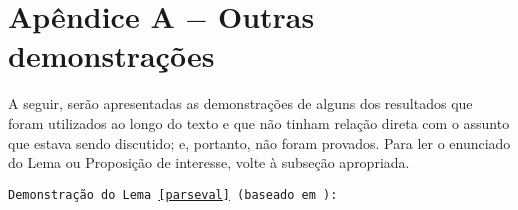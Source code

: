 \newpage

\section*{\Large \hspace*{\fill} \textbf{Apêndice A $-$ Outras demonstrações} \hspace*{\fill}}\label{apendice-primeiro}

\par A seguir, serão apresentadas as demonstrações de alguns dos resultados que foram utilizados ao longo do texto e que não tinham relação direta com o assunto que estava sendo discutido; e, portanto, não foram provados. Para ler o enunciado do Lema ou Proposição de interesse, volte à subseção apropriada.
\vspace{12pt}

\par \texttt{Demonstração do Lema \ref{parseval} (baseado em \cite{reu2016Spiro}):}

